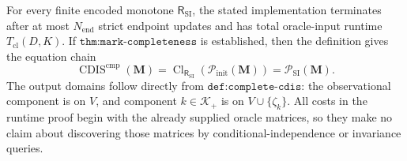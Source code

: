 For every finite encoded monotone \(\mathsf R_{\mathrm{SI}}\), the stated implementation terminates after at most \(N_{\mathrm{end}}\) strict endpoint updates and has total oracle-input runtime \(T_{\mathrm{cl}}(D,K)\).  If \(\texttt{thm:mark-completeness}\) is established, then the definition gives the equation chain \[\operatorname{CDIS}^{\mathrm{cmp}}(\mathbf M)=\operatorname{Cl}_{\mathsf R_{\mathrm{SI}}}(\mathcal P_{\mathrm{init}}(\mathbf M))=\mathcal P_{\mathrm{SI}}(\mathbf M).\]The output domains follow directly from \(\texttt{def:complete-cdis}\): the observational component is on \(V\), and component \(k\in\mathcal K_+\) is on \(V\cup\{\zeta_k\}\).  All costs in the runtime proof begin with the already supplied oracle matrices, so they make no claim about discovering those matrices by conditional-independence or invariance queries.